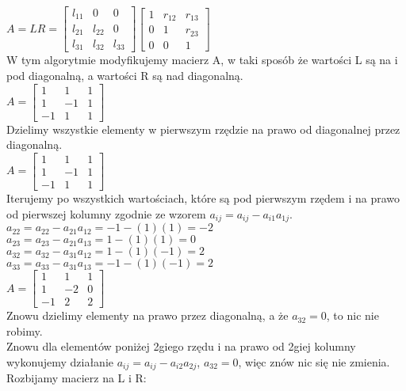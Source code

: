 \documentclass{article}
\begin{document}
$A=LR=\begin{bmatrix} l_{11} & 0 & 0 \\ l_{21} & l_{22} & 0 \\ l_{31} & l_{32} & l_{33} \end{bmatrix} \begin{bmatrix} 1 & r_{12} & r_{13} \\ 0 & 1 & r_{23} \\ 0 & 0 & 1 \end{bmatrix}$\\
W tym algorytmie modyfikujemy macierz A, w taki sposób że wartości L są na i pod diagonalną, a wartości R są nad diagonalną.\\
$A=\begin{bmatrix} 1 & 1 & 1 \\ 1 & -1 & 1 \\ -1 & 1 & 1 \end{bmatrix}$\\
Dzielimy wszystkie elementy w pierwszym rzędzie na prawo od diagonalnej przez diagonalną.\\
$A=\begin{bmatrix} 1 & 1 & 1 \\ 1 & -1 & 1 \\ -1 & 1 & 1 \end{bmatrix}$\\
Iterujemy po wszystkich wartościach, które są pod pierwszym rzędem i na prawo od pierwszej kolumny zgodnie ze wzorem $a_{ij}=a_{ij}-a_{i1}a_{1j}$.\\ 
$a_{22}=a_{22}-a_{21}a_{12}=-1-(1)(1)=-2$\\
$a_{23}=a_{23}-a_{21}a_{13}=1-(1)(1)=0$\\
$a_{32}=a_{32}-a_{31}a_{12}=1-(1)(-1)=2$\\
$a_{33}=a_{33}-a_{31}a_{13}=-1-(1)(-1)=2$\\

$A=\begin{bmatrix} 1 & 1 & 1 \\ 1 & -2 & 0 \\ -1 & 2 & 2 \end{bmatrix}$\\

Znowu dzielimy elementy na prawo przez diagonalną, a że $a_{32}=0$, to nic nie robimy.\\
Znowu dla elementów poniżej 2giego rzędu i na prawo od 2giej kolumny wykonujemy działanie $a_{ij}=a_{ij}-a_{i2}a_{2j}$, $a_{32}=0$, więc znów nic się nie zmienia.\\
Rozbijamy macierz na L i R:\\
\end{document}
